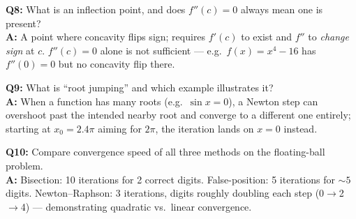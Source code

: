 \begin{qabox}
\textbf{Q8:} What is an inflection point, and does $f''(c)=0$ always mean one is present? \\
\textbf{A:} A point where concavity flips sign; requires $f'(c)$ to exist and $f''$ to \emph{change sign} at $c$. $f''(c)=0$ alone is not sufficient — e.g.\ $f(x)=x^4-16$ has $f''(0)=0$ but no concavity flip there.

\textbf{Q9:} What is ``root jumping'' and which example illustrates it? \\
\textbf{A:} When a function has many roots (e.g.\ $\sin x=0$), a Newton step can overshoot past the intended nearby root and converge to a different one entirely; starting at $x_0=2.4\pi$ aiming for $2\pi$, the iteration lands on $x=0$ instead.

\textbf{Q10:} Compare convergence speed of all three methods on the floating-ball problem. \\
\textbf{A:} Bisection: 10 iterations for 2 correct digits. False-position: 5 iterations for $\sim5$ digits. Newton--Raphson: 3 iterations, digits roughly doubling each step (0$\to$2$\to$4) — demonstrating quadratic vs.\ linear convergence.
\end{qabox}
